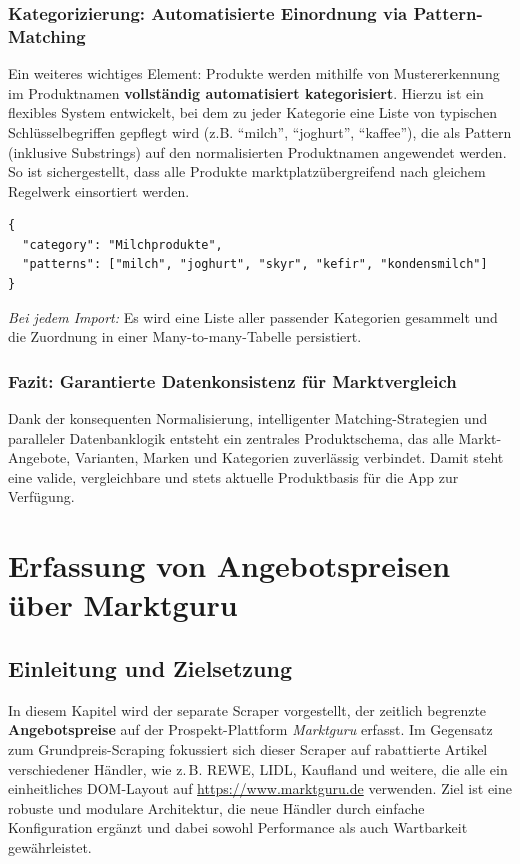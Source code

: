 \documentclass[12pt, a4paper]{report} %
\newcommand{\authorinitials}{} %
\begin{document}
\subsection{Kategorizierung: Automatisierte Einordnung via Pattern-Matching}

Ein weiteres wichtiges Element: Produkte werden mithilfe von Mustererkennung im Produktnamen \textbf{vollständig automatisiert kategorisiert}. Hierzu ist ein flexibles System entwickelt, bei dem zu jeder Kategorie eine Liste von typischen Schlüsselbegriffen gepflegt wird (z.B. "`milch"', "`joghurt"', "`kaffee"'), die als Pattern (inklusive Substrings) auf den normalisierten Produktnamen angewendet werden. So ist sichergestellt, dass alle Produkte marktplatzübergreifend nach gleichem Regelwerk einsortiert werden.

\begin{lstlisting}[style=typescriptstyle, caption={Beispielstruktur: Kategorie-Definitionen als JSON}]
{
  "category": "Milchprodukte",
  "patterns": ["milch", "joghurt", "skyr", "kefir", "kondensmilch"]
}
\end{lstlisting}

\emph{Bei jedem Import:} Es wird eine Liste aller passender Kategorien gesammelt und die Zuordnung in einer Many-to-many-Tabelle persistiert.

\subsection{Fazit: Garantierte Datenkonsistenz für Marktvergleich}

Dank der konsequenten Normalisierung, intelligenter Matching-Strategien und paralleler Datenbanklogik entsteht ein zentrales Produktschema, das alle Markt-Angebote, Varianten, Marken und Kategorien zuverlässig verbindet. Damit steht eine valide, vergleichbare und stets aktuelle Produktbasis für die App zur Verfügung.

\cleardoublepage

\chapter{Erfassung von Angebotspreisen über Marktguru}
\renewcommand{\authorinitials}{DH}
\label{chap:marktguru_scraping}

\section{Einleitung und Zielsetzung}
In diesem Kapitel wird der separate Scraper vorgestellt, der zeitlich begrenzte \textbf{Angebotspreise} auf der Prospekt-Plattform \textit{Marktguru} erfasst. Im Gegensatz zum Grundpreis-Scraping fokussiert sich dieser Scraper auf rabattierte Artikel verschiedener Händler, wie z.\,B. REWE, LIDL, Kaufland und weitere, die alle ein einheitliches DOM-Layout auf \url{https://www.marktguru.de} verwenden. Ziel ist eine robuste und modulare Architektur, die neue Händler durch einfache Konfiguration ergänzt und dabei sowohl Performance als auch Wartbarkeit gewährleistet.
\end{document}
